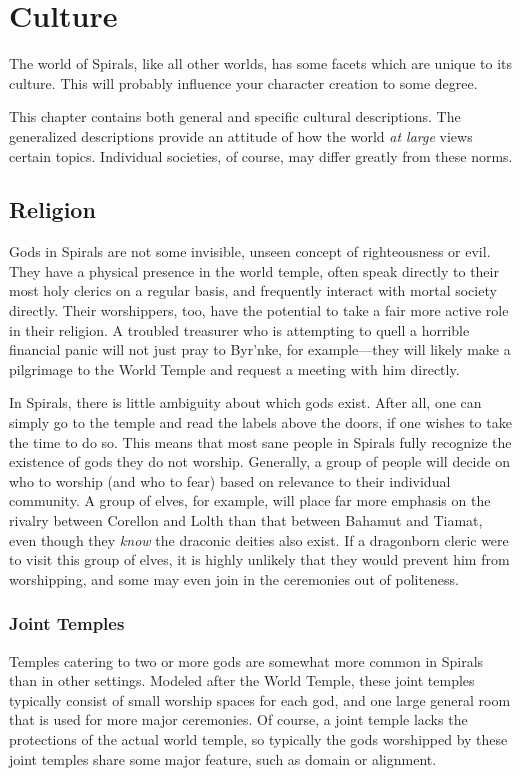 \chapter{Culture}
The world of Spirals, like all other worlds, has some facets which are unique to its culture.
This will probably influence your character creation to some degree.

This chapter contains both general and specific cultural descriptions.
The generalized descriptions provide an attitude of how the world \textit{at large} views certain topics.
Individual societies, of course, may differ greatly from these norms.

\begin{multicols}{2}
\section{Religion}
Gods in Spirals are not some invisible, unseen concept of righteousness or evil.
They have a physical presence in the world temple, often speak directly to their most holy clerics on a regular basis, and frequently interact with mortal society directly.
Their worshippers, too, have the potential to take a fair more active role in their religion.
A troubled treasurer who is attempting to quell a horrible financial panic will not just pray to Byr’nke, for example---they will likely make a pilgrimage to the World Temple and request a meeting with him directly.

In Spirals, there is little ambiguity about which gods exist.
After all, one can simply go to the temple and read the labels above the doors, if one wishes to take the time to do so.
This means that most sane people in Spirals fully recognize the existence of gods they do not worship.
Generally, a group of people will decide on who to worship (and who to fear) based on relevance to their individual community.
A group of elves, for example, will place far more emphasis on the rivalry between Corellon and Lolth than that between Bahamut and Tiamat, even though they \textit{know} the draconic deities also exist.
If a dragonborn cleric were to visit this group of elves, it is highly unlikely that they would prevent him from worshipping, and some may even join in the ceremonies out of politeness.

\subsection{Joint Temples}
Temples catering to two or more gods are somewhat more common in Spirals than in other settings.
Modeled after the World Temple, these joint temples typically consist of small worship spaces for each god, and one large general room that is used for more major ceremonies.
Of course, a joint temple lacks the protections of the actual world temple, so typically the gods worshipped by these joint temples share some major feature, such as domain or alignment.


\end{multicols}
